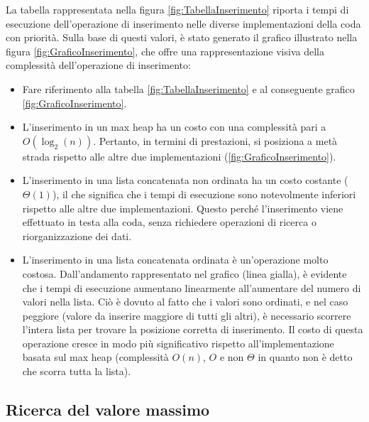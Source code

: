 \documentclass{article}
\begin{document}
La tabella rappresentata nella figura \ref{fig:TabellaInserimento} riporta i tempi di esecuzione dell'operazione di inserimento nelle diverse implementazioni della coda con priorità. Sulla base di questi valori, è stato generato il grafico illustrato nella figura \ref{fig:GraficoInserimento}, che offre una rappresentazione visiva della complessità dell'operazione di inserimento:

\begin{itemize}
\item Fare riferimento alla tabella \ref{fig:TabellaInserimento} e al conseguente grafico \ref{fig:GraficoInserimento}.

\item L'inserimento in un max heap ha un costo con una complessità pari a $O(\log_2(n))$. Pertanto, in termini di prestazioni, si posiziona a metà strada rispetto alle altre due implementazioni (\ref{fig:GraficoInserimento}).

\item L'inserimento in una lista concatenata non ordinata ha un costo costante ($\Theta(1)$), il che significa che i tempi di esecuzione sono notevolmente inferiori rispetto alle altre due implementazioni. Questo perché l'inserimento viene effettuato in testa alla coda, senza richiedere operazioni di ricerca o riorganizzazione dei dati.

\item L'inserimento in una lista concatenata ordinata è un'operazione molto costosa. Dall'andamento rappresentato nel grafico (linea gialla), è evidente che i tempi di esecuzione aumentano linearmente all'aumentare del numero di valori nella lista. Ciò è dovuto al fatto che i valori sono ordinati, e nel caso peggiore (valore da inserire maggiore di tutti gli altri), è necessario scorrere l'intera lista per trovare la posizione corretta di inserimento. Il costo di questa operazione cresce in modo più significativo rispetto all'implementazione basata sul max heap (complessità $O(n)$, $O$ e non $\Theta$ in quanto non è detto che scorra tutta la lista).

\end{itemize}

\subsection{Ricerca del valore massimo}
\end{document}
